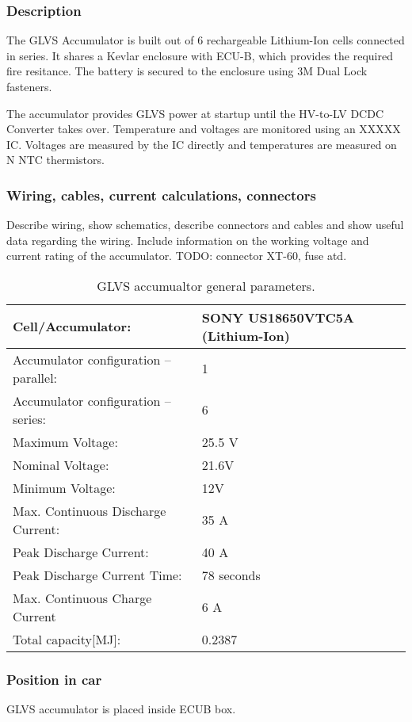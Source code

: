 \subsubsection{Description}

The GLVS Accumulator is built out of 6 rechargeable Lithium-Ion cells connected in series. It shares a Kevlar enclosure with ECU-B, which provides the required fire resitance. The battery is secured to the enclosure using 3M Dual Lock fasteners.

The accumulator provides GLVS power at startup until the HV-to-LV DCDC Converter takes over. Temperature and voltages are monitored using an XXXXX IC. Voltages are measured by the IC directly and temperatures are measured on N NTC thermistors.

\subsubsection{Wiring, cables, current calculations, connectors}
Describe wiring, show schematics, describe connectors and cables and show useful data regarding the wiring.  Include information on the working voltage and current rating of the accumulator.
TODO: connector XT-60, fuse atd.

\begin{table}[H]
	\centering
	\caption{GLVS accumualtor general parameters.}
	\begin{tabularx}{\textwidth}{|X|X|}\hline
		Cell/Accumulator: & SONY US18650VTC5A (Lithium-Ion)\\[\TableSize]\hline
		Accumulator configuration – parallel: & 1 \\[\TableSize]\hline
		Accumulator configuration – series: & 6 \\[\TableSize]\hline
		Maximum Voltage: & 25.5 V \\[\TableSize]\hline
		Nominal Voltage: & 21.6V \\[\TableSize]\hline
		Minimum Voltage: & 12V \\[\TableSize]\hline
		Max. Continuous Discharge Current: & 35 A \\[\TableSize]\hline
		Peak Discharge Current: & 40 A \\[\TableSize]\hline
		Peak Discharge Current Time: & 78 seconds \\[\TableSize]\hline
		Max. Continuous Charge Current & 6 A \\[\TableSize]\hline
		Total capacity[MJ]: & 0.2387 \\[\TableSize]\hline
	\end{tabularx}%
	\label{tab:LVbatt-general}%
\end{table}%

\subsubsection{Position in car}

GLVS accumulator is placed inside ECUB box.